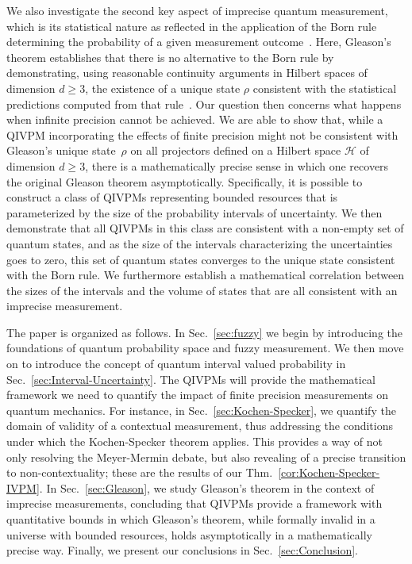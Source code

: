 \documentclass[english,reprint, aps, prl,superscriptaddress, showpacs,
showkeys, longbibliography, amsmath, amssymb, floatfix]{revtex4-1}
\theoremstyle{plain}
\theoremstyle{definition}
\newcommand{\Hilb}{\mathcal{H}}
\begin{document}
We also investigate the second key aspect of imprecise quantum
measurement, which is its statistical nature as reflected in the
application of the Born rule determining the probability of a given
measurement outcome~\citep{Born1983,Mermin2007,Jaeger2007}.  Here,
Gleason's theorem establishes that there is no alternative to the Born
rule by demonstrating, using reasonable continuity arguments in
Hilbert spaces of dimension $d\ge3$, the existence of a unique state
$\rho$ consistent with the statistical predictions computed from that
rule~\citep{gleason1957,Redhead1987-REDINA,peres1995quantum}.  Our
question then concerns what happens when infinite precision cannot be
achieved.  We are able to show that, while a QIVPM incorporating the
effects of finite precision might not be consistent with Gleason's
unique state~$\rho$ on all projectors defined on a Hilbert space
$\Hilb$ of dimension $d\ge3$, there is a mathematically precise sense
in which one recovers the original Gleason theorem asymptotically.
Specifically, it is possible to construct a class of QIVPMs
representing bounded resources that is parameterized by the size of
the probability intervals of uncertainty. We then demonstrate that all
QIVPMs in this class are consistent with a non-empty set of quantum
states, and as the size of the intervals characterizing the
uncertainties goes to zero, this set of quantum states converges to
the unique state consistent with the Born rule. We furthermore
establish a mathematical correlation between the sizes of the
intervals and the volume of states that are all consistent with an
imprecise measurement.

The paper is organized as follows.  In Sec.~\ref{sec:fuzzy} we begin
by introducing the foundations of quantum probability space and fuzzy
measurement.  We then move on to introduce the concept of quantum
interval valued probability in Sec.~\ref{sec:Interval-Uncertainty}.
The QIVPMs will provide the mathematical framework we need to quantify
the impact of finite precision measurements on quantum mechanics.  For
instance, in Sec.~\ref{sec:Kochen-Specker}, we quantify the domain of
validity of a contextual measurement, thus addressing the conditions
under which the Kochen-Specker theorem applies.  This provides a way
of not only resolving the Meyer-Mermin debate, but also revealing of a
precise transition to non-contextuality; these are the results of our
Thm.~\ref{cor:Kochen-Specker-IVPM}.  In Sec.~\ref{sec:Gleason}, we
study Gleason's theorem in the context of imprecise measurements,
concluding that QIVPMs provide a framework with quantitative bounds in
which Gleason's theorem, while formally invalid in a universe with
bounded resources, holds asymptotically in a mathematically precise
way.  Finally, we present our conclusions in
Sec.~\ref{sec:Conclusion}.
\end{document}
